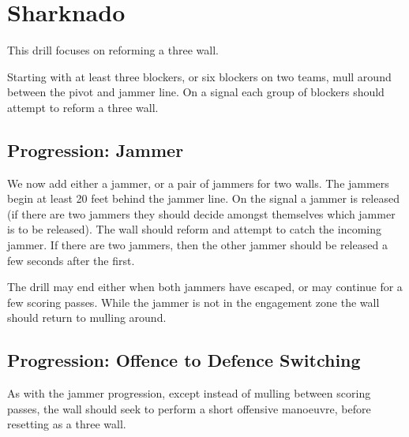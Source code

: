 \section*{Sharknado}
\label{drill:three_wall:reforming/sharknado}

This drill focuses on reforming a three wall.

Starting with at least three blockers, or six blockers on two teams, mull around between the pivot and jammer line. 
On a signal each group of blockers should attempt to reform a three wall.


\subsection*{Progression: Jammer}
\label{drill:three_wall:sharknado:jammer}


We now add either a jammer, or a pair of jammers for two walls.
The jammers begin at least 20 feet behind the jammer line.
On the signal a jammer is released (if there are two jammers they should decide amongst themselves which jammer is to be released).
The wall should reform and attempt to catch the incoming jammer.
If there are two jammers, then the other jammer should be released a few seconds after the first.  

The drill may end either when both jammers have escaped, or may continue for a few scoring passes.
While the jammer is not in the engagement zone the wall should return to mulling around.


\subsection*{Progression: Offence to Defence Switching}
\label{drill:three_wall:sharknado:o_to_d}

As with the jammer progression, except instead of mulling between scoring passes, the wall should seek to perform a short offensive manoeuvre, before resetting as a three wall.    
